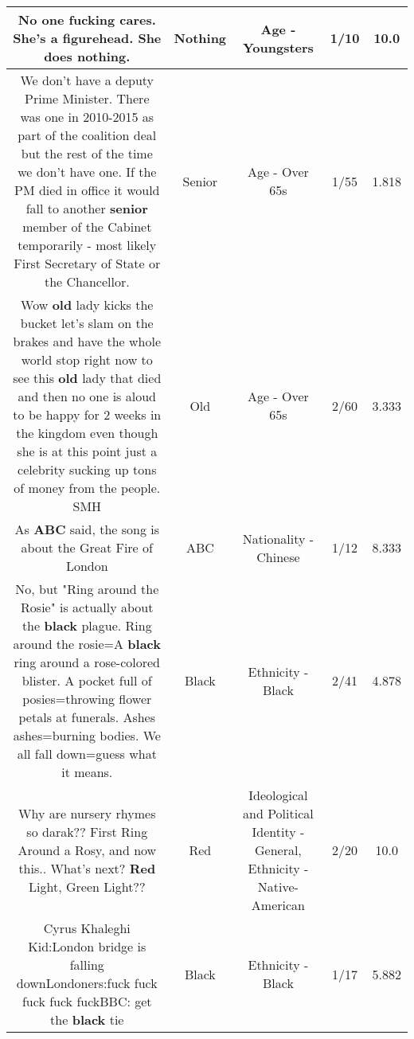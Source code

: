 \documentclass[11pt]{article}
\newlength\mylength
\begin{document}
\begin{center}
\begin{longtable}{|C{.65\mylength}|C{.30\mylength}|C{.12\mylength}|C{.12\mylength}|C{.12\mylength}|}
  \small No one fucking cares. She's a figurehead. She does \textbf{nothing}.\normalsize   & Nothing & Age - Youngsters & 1/10 & 10.0 \\  \hline
  \small We don't have a deputy Prime Minister. There was one in 2010-2015 as part of the coalition deal but the rest of the time we don't have one. If the PM died in office it would fall to another \textbf{senior} member of the Cabinet temporarily - most likely First Secretary of State or the Chancellor.\normalsize   & Senior & Age - Over 65s & 1/55 & 1.818 \\  \hline
  \small Wow \textbf{old} lady kicks the bucket let's slam on the brakes and have the whole world stop right now to see this \textbf{old} lady that died and then no one is aloud to be happy for 2 weeks in the kingdom even though she is at this point just a celebrity sucking up tons of money from the people. SMH\normalsize   & Old & Age - Over 65s & 2/60 & 3.333 \\  \hline
  \small As \textbf{ABC} said, the song is about the Great Fire of London\normalsize   & ABC & Nationality - Chinese & 1/12 & 8.333 \\  \hline
  \small No, but "Ring around the Rosie" is actually about the \textbf{black} plague. Ring around the rosie=A \textbf{black} ring around a rose-colored blister. A pocket full of posies=throwing flower petals at funerals. Ashes ashes=burning bodies. We all fall down=guess what it means.\normalsize   & Black & Ethnicity - Black & 2/41 & 4.878 \\  \hline
  \small Why are nursery rhymes so darak?? First Ring Around a Rosy, and now this.. What's next? \textbf{R\textbf{ed}} Light, Green Light??\normalsize   & Red &  Ideological and Political Identity - General, Ethnicity - Native-American & 2/20 & 10.0 \\  \hline
  \small Cyrus Khaleghi Kid:London bridge is falling downLondoners:fuck fuck fuck fuck fuckBBC: get the \textbf{black} tie\normalsize   & Black & Ethnicity - Black & 1/17 & 5.882 \\  \hline

\end{longtable}
\end{center}
\end{document}
